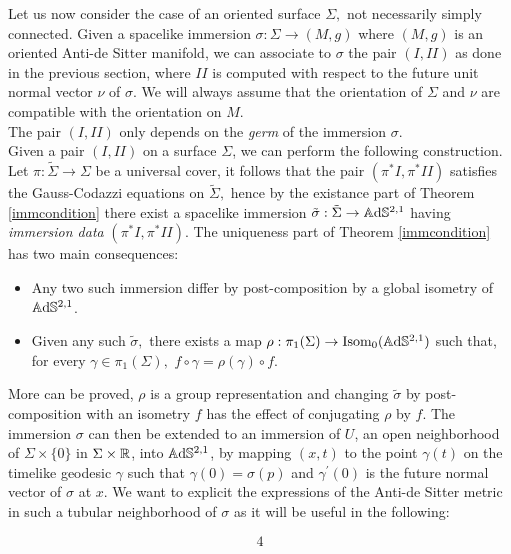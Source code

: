 Let us now consider the case of an oriented surface $\Sigma,$ not necessarily simply connected. Given a spacelike immersion $\sigma:\Sigma\to(M,g)$ where $(M,g)$ is an oriented Anti-de Sitter manifold, we can associate to $\sigma$ the pair $(I,II)$ as done in the previous section, where $II$ is computed with respect to the future unit normal vector $\nu$ of $\sigma$. We will always assume that the orientation of $\Sigma$ and $\nu$ are compatible with the orientation on $M.$\\
The pair $(I, II)$ only depends on the \textit{germ} of the immersion $\sigma.$\\
Given a pair $(I,II)$ on a surface $\Sigma$, we can perform the following construction. Let $\pi:\tilde{\Sigma}\to\Sigma$ be a universal cover, it follows that the pair $(\pi^*I,\pi^*II)$ satisfies the Gauss-Codazzi equations on $\tilde{\Sigma},$ hence by the existance part of Theorem \ref{immcondition} there exist a spacelike immersion $\tilde{\sigma}:\tilde{\Sigma}\to\mathbb{A}\mathrm{d}\mathbb{S}^{2,1}$ having \textit{immersion data} $(\pi^*I,\pi^*II)$. The uniqueness part of Theorem \ref{immcondition} has two main consequences: 

\begin{itemize}
    \item Any two such immersion differ by post-composition by a global isometry of $\mathbb{A}\mathrm{d}\mathbb{S}^{2,1}$. 
    \item Given any such $\tilde{\sigma},$ there exists a map $\rho:\pi_1(\Sigma)\to\text{Isom}_0(\mathbb{A}\mathrm{d}\mathbb{S}^{2,1})$ such that, for every $\gamma\in\pi_1(\Sigma),$ $f\circ\gamma=\rho(\gamma)\circ f$. 
\end{itemize}

More can be proved, $\rho$ is a group representation and changing $\tilde{\sigma}$ by post-composition with an isometry $f$ has the effect of conjugating $\rho$ by $f$. The immersion $\sigma$ can then be extended to an immersion of $U$, an open neighborhood of $\Sigma\times\{0\}$ in $\Sigma\times\mathbb{R}$, into $\mathbb{A}\mathrm{d}\mathbb{S}^{2,1}$, by mapping $(x,t)$ to the point $\gamma(t)$ on the timelike geodesic $\gamma$ such that $\gamma(0)=\sigma(p)$ and $\gamma^{\prime}(0)$ is the future normal vector of $\sigma$ at $x$. We want to explicit the expressions of the Anti-de Sitter metric in such a tubular neighborhood of $\sigma$ as it will be useful in the following: 

\begin{lemma}
    

\begin{equation}\label{64}
    4
\end{equation}


\end{lemma}

